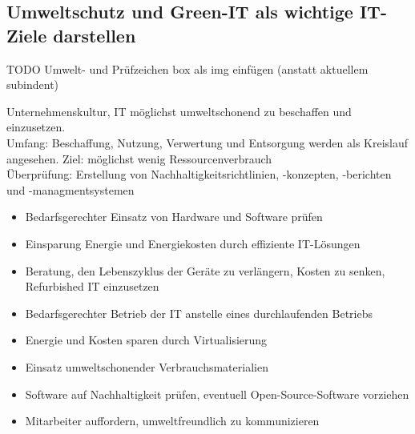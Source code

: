 \subsection{Umweltschutz und Green-IT als wichtige IT-Ziele darstellen}
    \begin{subindent}
        TODO Umwelt- und Prüfzeichen box als img einfügen (anstatt aktuellem subindent)
    \end{subindent}
    \begin{tcolorbox}[width=11cm, center, title=Green-IT, coltitle=white, colframe=orange, colback=white!60!orange]
        Unternehmenskultur, IT möglichst umweltschonend zu beschaffen und einzusetzen.\\
        Umfang: Beschaffung, Nutzung, Verwertung und Entsorgung werden als Kreislauf angesehen. Ziel: möglichst wenig Ressourcenverbrauch \\
        Überprüfung: Erstellung von Nachhaltigkeitsrichtlinien, -konzepten, -berichten und -managmentsystemen
    \end{tcolorbox}
    \begin{tcolorbox}[width=14cm, center, title=Maßnahmenkatalog Green-IT, coltitle=white, colframe=orange, colback=white!60!orange]
        \begin{itemize}[itemsep=0.1em, parsep=0.3em]
            \item Bedarfsgerechter Einsatz von Hardware und Software prüfen
            \item Einsparung Energie und Energiekosten durch effiziente IT-Lösungen
            \item Beratung, den Lebenszyklus der Geräte zu verlängern, Kosten zu senken, Refurbished IT einzusetzen
            \item Bedarfsgerechter Betrieb der IT anstelle eines durchlaufenden Betriebs
            \item Energie und Kosten sparen durch Virtualisierung
            \item Einsatz umweltschonender Verbrauchsmaterialien
            \item Software auf Nachhaltigkeit prüfen, eventuell Open-Source-Software vorziehen
            \item Mitarbeiter auffordern, umweltfreundlich zu kommunizieren
        \end{itemize}
    \end{tcolorbox}
